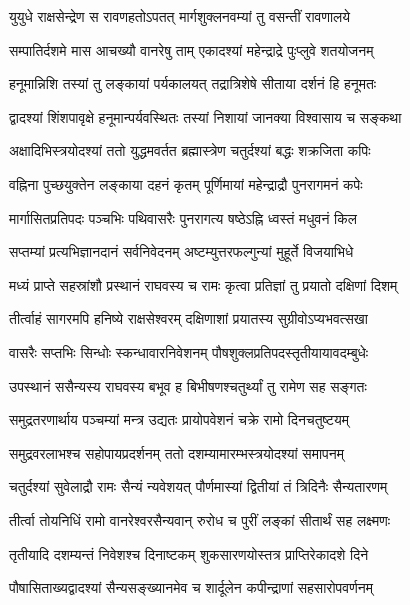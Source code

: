 \twolineshloka
{युयुधे राक्षसेन्द्रेण स रावणहतोऽपतत्}
{मार्गशुक्लनवम्यां तु वसन्तीं रावणालये}%

\twolineshloka
{सम्पातिर्दशमे मास आचख्यौ वानरेषु ताम्}
{एकादश्यां महेन्द्राद्रे पुःप्लुवे शतयोजनम्}%

\twolineshloka
{हनूमान्निशि तस्यां तु लङ्कायां पर्यकालयत्}
{तद्रात्रिशेषे सीताया दर्शनं हि हनूमतः}%

\twolineshloka
{द्वादश्यां शिंशपावृक्षे हनूमान्पर्यवस्थितः}
{तस्यां निशायां जानक्या विश्वासाय च सङ्कथा}%

\twolineshloka
{अक्षादिभिस्त्रयोदश्यां ततो युद्धमवर्तत}
{ब्रह्मास्त्रेण चतुर्दश्यां बद्धः शक्रजिता कपिः}%

\twolineshloka
{वह्निना पुच्छयुक्तेन लङ्काया दहनं कृतम्}
{पूर्णिमायां महेन्द्राद्रौ पुनरागमनं कपेः}%

\twolineshloka
{मार्गासितप्रतिपदः पञ्चभिः पथिवासरैः}
{पुनरागत्य षष्ठेऽह्नि ध्वस्तं मधुवनं किल}%

\twolineshloka
{सप्तम्यां प्रत्यभिज्ञानदानं सर्वनिवेदनम्}
{अष्टम्युत्तरफल्गुन्यां मुहूर्ते विजयाभिधे}%

\twolineshloka
{मध्यं प्राप्ते सहस्रांशौ प्रस्थानं राघवस्य च}
{रामः कृत्वा प्रतिज्ञां तु प्रयातो दक्षिणां दिशम्}%

\twolineshloka
{तीर्त्वाहं सागरमपि हनिष्ये राक्षसेश्वरम्}
{दक्षिणाशां प्रयातस्य सुग्रीवोऽप्यभवत्सखा}%

\twolineshloka
{वासरैः सप्तभिः सिन्धोः स्कन्धावारनिवेशनम्}
{पौषशुक्लप्रतिपदस्तृतीयायावदम्बुधेः}%

\twolineshloka
{उपस्थानं ससैन्यस्य राघवस्य बभूव ह}
{बिभीषणश्चतुर्थ्यां तु रामेण सह सङ्गतः}%

\twolineshloka
{समुद्रतरणार्थाय पञ्चम्यां मन्त्र उद्यतः}
{प्रायोपवेशनं चक्रे रामो दिनचतुष्टयम्}%

\twolineshloka
{समुद्रवरलाभश्च सहोपायप्रदर्शनम्}
{ततो दशम्यामारम्भस्त्रयोदश्यां समापनम्}%

\twolineshloka
{चतुर्दश्यां सुवेलाद्रौ रामः सैन्यं न्यवेशयत्}
{पौर्णमास्यां द्वितीयां तं त्रिदिनैः सैन्यतारणम्}%

\twolineshloka
{तीर्त्वा तोयनिधिं रामो वानरेश्वरसैन्यवान्}
{रुरोध च पुरीं लङ्कां सीतार्थं सह लक्ष्मणः}%

\twolineshloka
{तृतीयादि दशम्यन्तं निवेशश्च दिनाष्टकम्}
{शुकसारणयोस्तत्र प्राप्तिरेकादशे दिने}%

\twolineshloka
{पौषासिताख्यद्वादश्यां सैन्यसङ्ख्यानमेव च}
{शार्दूलेन कपीन्द्राणां सहसारोपवर्णनम्}%

